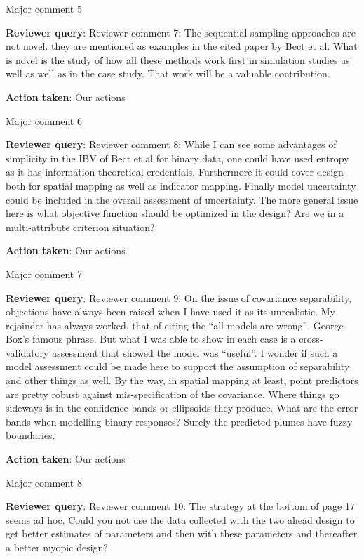 \documentclass[a4paper]{article}
\def\reply{\textbf{Reviewer query}}
\def\action{\textbf{Action taken}}
\begin{document}
\begin{answers}
\item{Major comment 5}\label{q5}

\reply: Reviewer comment 7: The sequential sampling approaches are not novel. they are mentioned as examples in the cited paper by Bect et al. What is novel is the study of how all these methods work first in simulation studies as well as well as in the case study. That work will be a valuable contribution.

\action: Our actions

\item{Major comment 6}\label{q6}

\reply: Reviewer comment 8: While I can see some advantages of simplicity in the IBV of Bect et al for binary data, one could have used entropy as it has information-theoretical credentials. Furthermore it could cover design both for spatial mapping as well as indicator mapping. Finally model uncertainty could be included in the overall assessment of uncertainty. The more general issue here is what objective function should be optimized in the design? Are we in a multi-attribute criterion situation?

\action: Our actions

\item{Major comment 7}\label{q7}

\reply: Reviewer comment 9: On the issue of covariance separability, objections have always been raised when I have used it as its unrealistic. My rejoinder has always worked, that of citing the “all models are wrong”, George Box’s famous phrase. But what I was able to show in each case is a cross-validatory assessment that showed the model was “useful”. I wonder if such a model assessment could be made here to support the assumption of separability and other things as well. By the way, in spatial mapping at least, point predictors are pretty robust against mis-specification of the covariance. Where things go sideways is in the confidence bands or ellipsoids they produce. What are the error bands when modelling binary responses? Surely the predicted plumes have fuzzy boundaries. 

\action: Our actions

\item{Major comment 8}\label{q8}

\reply: Reviewer comment 10: The strategy at the bottom of page 17 seems ad hoc. Could you not use the data collected with the two ahead design to get better estimates of parameters and then with these parameters and thereafter a better myopic design?


\end{answers}
\end{document}
